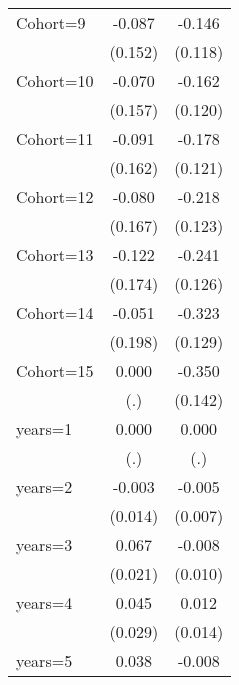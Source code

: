 \begin{table}[htbp]
\begin{tabular}{l*{2}{c}}
\addlinespace
Cohort=9            &      -0.087         &      -0.146         \\
                    &     (0.152)         &     (0.118)         \\
\addlinespace
Cohort=10           &      -0.070         &      -0.162         \\
                    &     (0.157)         &     (0.120)         \\
\addlinespace
Cohort=11           &      -0.091         &      -0.178         \\
                    &     (0.162)         &     (0.121)         \\
\addlinespace
Cohort=12           &      -0.080         &      -0.218\sym{*}  \\
                    &     (0.167)         &     (0.123)         \\
\addlinespace
Cohort=13           &      -0.122         &      -0.241\sym{*}  \\
                    &     (0.174)         &     (0.126)         \\
\addlinespace
Cohort=14           &      -0.051         &      -0.323\sym{**} \\
                    &     (0.198)         &     (0.129)         \\
\addlinespace
Cohort=15           &       0.000         &      -0.350\sym{**} \\
                    &         (.)         &     (0.142)         \\
\addlinespace
years=1             &       0.000         &       0.000         \\
                    &         (.)         &         (.)         \\
\addlinespace
years=2             &      -0.003         &      -0.005         \\
                    &     (0.014)         &     (0.007)         \\
\addlinespace
years=3             &       0.067\sym{***}&      -0.008         \\
                    &     (0.021)         &     (0.010)         \\
\addlinespace
years=4             &       0.045         &       0.012         \\
                    &     (0.029)         &     (0.014)         \\
\addlinespace
years=5             &       0.038         &      -0.008         \\

\end{tabular}
\end{table}
